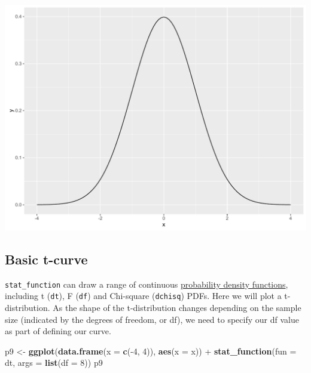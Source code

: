 \documentclass[]{article}
\newenvironment{Shaded}{\begin{snugshade}}{\end{snugshade}}
\newcommand{\KeywordTok}[1]{\textcolor[rgb]{0.13,0.29,0.53}{\textbf{{#1}}}}
\newcommand{\DataTypeTok}[1]{\textcolor[rgb]{0.13,0.29,0.53}{{#1}}}
\newcommand{\DecValTok}[1]{\textcolor[rgb]{0.00,0.00,0.81}{{#1}}}
\newcommand{\StringTok}[1]{\textcolor[rgb]{0.31,0.60,0.02}{{#1}}}
\newcommand{\NormalTok}[1]{{#1}}
\begin{document}
\begin{center}\includegraphics{0_all_posts_pdf/function_1-1} \end{center}

\subsection{Basic t-curve}\label{basic-t-curve}

\texttt{stat\_function} can draw a range of continuous
\href{https://en.wikipedia.org/wiki/Probability_density_function}{probability
density functions}, including t (\texttt{dt}), F (\texttt{df}) and
Chi-square (\texttt{dchisq}) PDFs. Here we will plot a t-distribution.
As the shape of the t-distribution changes depending on the sample size
(indicated by the degrees of freedom, or df), we need to specify our df
value as part of defining our curve.

\begin{Shaded}
\begin{Highlighting}[]
\NormalTok{p9 <-}\StringTok{ }\KeywordTok{ggplot}\NormalTok{(}\KeywordTok{data.frame}\NormalTok{(}\DataTypeTok{x =} \KeywordTok{c}\NormalTok{(-}\DecValTok{4}\NormalTok{, }\DecValTok{4}\NormalTok{)), }\KeywordTok{aes}\NormalTok{(}\DataTypeTok{x =} \NormalTok{x)) +}
\StringTok{      }\KeywordTok{stat_function}\NormalTok{(}\DataTypeTok{fun =} \NormalTok{dt, }\DataTypeTok{args =} \KeywordTok{list}\NormalTok{(}\DataTypeTok{df =} \DecValTok{8}\NormalTok{))}
\NormalTok{p9}
\end{Highlighting}
\end{Shaded}
\end{document}
